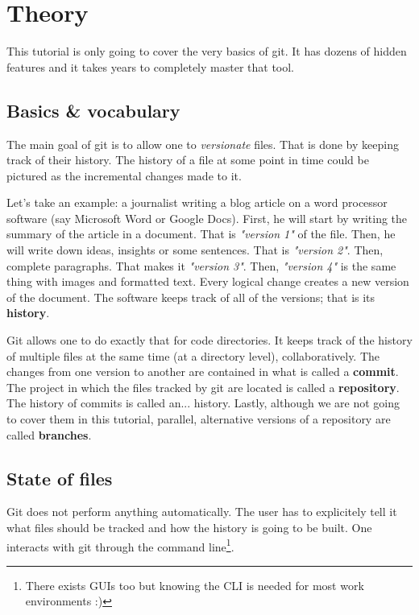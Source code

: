 \documentclass[12pt]{article}
\begin{document}
\section{Theory}

This tutorial is only going to cover the very basics of git. It has dozens of hidden features and it takes years to completely master that tool.

\subsection{Basics \& vocabulary}

The main goal of git is to allow one to \textit{versionate} files. That is done by keeping track of their history. The history of a file at some point in time could be pictured as the incremental changes made to it.

Let's take an example: a journalist writing a blog article on a word processor software (say Microsoft Word or Google Docs). First, he will start by writing the summary of the article in a document. That is \textit{"version 1"} of the file. Then, he will write down ideas, insights or some sentences. That is \textit{"version 2"}. Then, complete paragraphs. That makes it \textit{"version 3"}. Then, \textit{"version 4"} is the same thing with images and formatted text. Every logical change creates a new version of the document. The software keeps track of all of the versions; that is its \textbf{history}.

Git allows one to do exactly that for code directories. It keeps track of the history of multiple files at the same time (at a directory level), collaboratively.
The changes from one version to another are contained in what is called a \textbf{commit}. The project in which the files tracked by git are located is called a \textbf{repository}. The history of commits is called an... history. Lastly, although we are not going to cover them in this tutorial, parallel, alternative versions of a repository are called \textbf{branches}.

\subsection{State of files}

Git does not perform anything automatically. The user has to explicitely tell it what files should be tracked and how the history is going to be built. One interacts with git through the command line\footnote{There exists GUIs too but knowing the CLI is needed for most work environments :)}.
\end{document}
